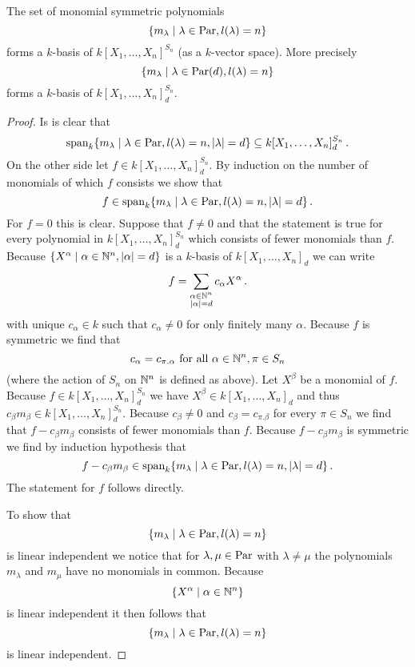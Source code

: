 \begin{lemma}
  The set of monomial symmetric polynomials
  \[
    \{
      m_\lambda
    \mid
      \lambda \in \operatorname{Par},
      l(\lambda) = n
    \}
  \]
  forms a $k$-basis of $k[X_1, \dotsc, X_n]^{S_n}$ (as a $k$-vector space). More precisely
  \[
    \{
      m_\lambda
    \mid
      \lambda \in \operatorname{Par}(d),
      l(\lambda) = n
    \}
  \]
  forms a $k$-basis of $k[X_1, \dotsc, X_n]^{S_n}_d$.
\end{lemma}
\begin{proof}
  Is is clear that
  \[
            \operatorname{span}_k \{
                        m_\lambda
                      \mid
                        \lambda \in \operatorname{Par},
                        l(\lambda) = n,
                        |\lambda| = d
                      \}
  \subseteq k[X_1, \dotsc, X_n]^{S_n}_d \,.
  \]
  On the other side let $f \in k[X_1, \dotsc, X_n]^{S_n}_d$. By induction on the number of monomials of which $f$ consists we show that
  \[
        f
    \in \operatorname{span}_k  \{
                    m_\lambda
                  \mid
                    \lambda \in \operatorname{Par},
                    l(\lambda) = n,
                    |\lambda| = d
                  \} \,.
  \]
  For $f = 0$ this is clear.
  Suppose that $f \neq 0$ and that the statement is true for every polynomial in $k[X_1, \dotsc, X_n]^{S_n}_d$ which consists of fewer monomials than $f$.
  Because $\{X^\alpha \mid \alpha \in \mathbb{N}^n, |\alpha| = d \}$ is a $k$-basis of $k[X_1, \dotsc, X_n]_d$ we can write
  \[
      f
    = \sum_{\substack{\alpha \in \mathbb{N}^n \\ |\alpha| = d}} c_\alpha X^\alpha \,.
  \]
  with unique $c_\alpha \in k$ such that $c_\alpha \neq 0$ for only finitely many $\alpha$.
  Because $f$ is symmetric we find that
  \[
      c_\alpha
    = c_{\pi.\alpha}
    \text{ for all }
    \alpha \in \mathbb{N}^n,
    \pi \in S_n
  \]
  (where the action of $S_n$ on $\mathbb{N}^n$ is defined as above).
  Let $X^\beta$ be a monomial of $f$.
  Because $f \in k[X_1, \dotsc, X_n]^{S_n}_d$ we have $X^\beta \in k[X_1, \dotsc, X_n]_d$ and thus $c_\beta m_\beta \in k[X_1, \dotsc, X_n]^{S_n}_d$.
  Because $c_\beta \neq 0$ and $c_\beta = c_{\pi.\beta}$ for every $\pi \in S_n$ we find that $f - c_{\beta} m_\beta$ consists of fewer monomials than $f$.
  Because $f-c_{\beta} m_\beta$ is symmetric we find by induction hypothesis that
  \[
        f - c_{\beta} m_\beta
    \in \operatorname{span}_k  \{
                    m_\lambda
                  \mid
                    \lambda \in \operatorname{Par},
                    l(\lambda) = n,
                    |\lambda| = d
                  \} \,.
  \]
  The statement for $f$ follows directly.
  
  To show that
  \[
    \{
      m_\lambda
    \mid
      \lambda \in \operatorname{Par},
      l(\lambda) = n
    \}
  \]
  is linear independent we notice that for $\lambda, \mu \in \operatorname{Par}$ with $\lambda \neq \mu$ the polynomials $m_\lambda$ and $m_\mu$ have no monomials in common. Because
  \[
    \{
      X^\alpha
    \mid
      \alpha \in \mathbb{N}^n
    \}
  \]
  is linear independent it then follows that
  \[
    \{
      m_\lambda
    \mid
      \lambda \in \operatorname{Par},
      l(\lambda) = n
    \}
  \]
  is linear independent.
\end{proof}


